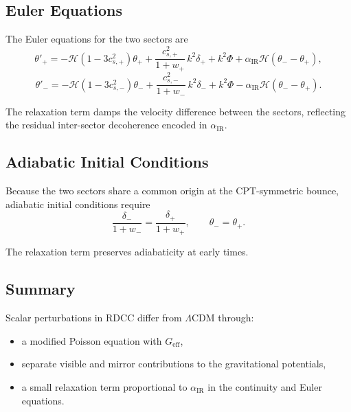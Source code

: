 \documentclass[11pt,a4paper]{article}
\begin{document}
\subsection{Euler Equations}

The Euler equations for the two sectors are
\begin{equation}
    \theta'_{+}
    = - \mathcal{H}(1 - 3c_{s,+}^{2})\theta_{+}
      + \frac{c_{s,+}^{2}}{1+w_{+}}\,k^{2}\delta_{+}
      + k^{2}\Phi
      + \alpha_{\mathrm{IR}}\mathcal{H}(\theta_{-} - \theta_{+}),
\end{equation}
\begin{equation}
    \theta'_{-}
    = - \mathcal{H}(1 - 3c_{s,-}^{2})\theta_{-}
      + \frac{c_{s,-}^{2}}{1+w_{-}}\,k^{2}\delta_{-}
      + k^{2}\Phi
      - \alpha_{\mathrm{IR}}\mathcal{H}(\theta_{-} - \theta_{+}).
\end{equation}

The relaxation term damps the velocity difference between the sectors, reflecting the residual
inter-sector decoherence encoded in $\alpha_{\mathrm{IR}}$.

\subsection{Adiabatic Initial Conditions}

Because the two sectors share a common origin at the CPT-symmetric bounce, adiabatic initial
conditions require
\begin{equation}
    \frac{\delta_{-}}{1+w_{-}}
    = \frac{\delta_{+}}{1+w_{+}},
    \qquad
    \theta_{-} = \theta_{+}.
\end{equation}

The relaxation term preserves adiabaticity at early times.

\subsection{Summary}

Scalar perturbations in RDCC differ from $\Lambda$CDM through:
\begin{itemize}
    \item a modified Poisson equation with $G_{\mathrm{eff}}$,
    \item separate visible and mirror contributions to the gravitational potentials,
    \item a small relaxation term proportional to $\alpha_{\mathrm{IR}}$ in the continuity and Euler
    equations.
\end{itemize}
\end{document}

